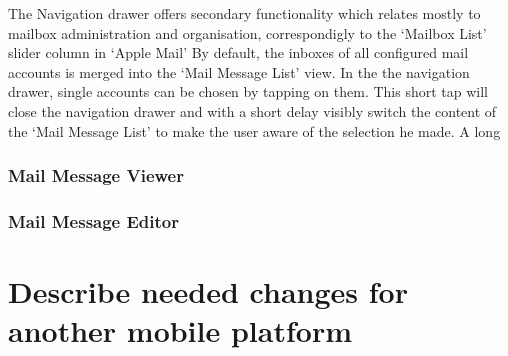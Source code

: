 \documentclass[a4paper,11pt,twoside]{article}
\begin{document}
The Navigation drawer offers secondary functionality which relates mostly to
mailbox administration and organisation, correspondigly to the `Mailbox List'
slider column in `Apple Mail'  By default, the inboxes of
all configured mail accounts is merged into the `Mail Message List' view. In the
the navigation drawer, single accounts can be chosen by tapping on them. This
short tap will close the navigation drawer and with a short delay visibly switch
the content of the `Mail Message List' to make the user aware of the selection
he made. A long 


\subsubsection{Mail Message Viewer}

\subsubsection{Mail Message Editor}







\section{Describe needed changes for another mobile platform}



\end{document}
